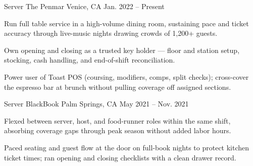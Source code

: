 \documentclass[10pt, letterpaper]{awesome-cv}
\begin{document}
\begin{cventries}

  \cventry
    {Server}
    {The Penmar}
    {Venice, CA}
    {Jan. 2022 -- Present}
    {
      \begin{cvitems}
        \item {Run full table service in a high-volume dining room, sustaining pace and ticket accuracy through live-music nights drawing crowds of 1{,}200+ guests.}
        \item {Own opening and closing as a trusted key holder --- floor and station setup, stocking, cash handling, and end-of-shift reconciliation.}
        \item {Power user of Toast POS (coursing, modifiers, comps, split checks); cross-cover the espresso bar at brunch without pulling coverage off assigned sections.}
      \end{cvitems}
    }

  \cventry
    {Server}
    {BlackBook}
    {Palm Springs, CA}
    {May 2021 -- Nov. 2021}
    {
      \begin{cvitems}
        \item {Flexed between server, host, and food-runner roles within the same shift, absorbing coverage gaps through peak season without added labor hours.}
        \item {Paced seating and guest flow at the door on full-book nights to protect kitchen ticket times; ran opening and closing checklists with a clean drawer record.}
      \end{cvitems}
    }


\end{cventries}
\end{document}
